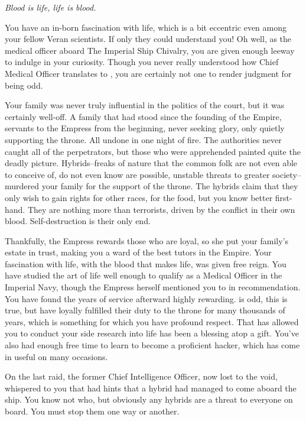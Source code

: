 \documentclass[char]{guildcamp4}
\begin{document}
\name{\cVthree{}}

\textit{Blood is life, life is blood.}

You have an in-born fascination with life, which is a bit eccentric even among your fellow Veran scientists. If only they could understand you! Oh well, as the medical officer aboard The Imperial Ship Chivalry, you are given enough leeway to indulge in your curiosity. Though you never really understood how Chief Medical Officer translates to \cVthree{\Baron}, you are certainly not one to render judgment for being odd.

Your family was never truly influential in the politics of the court, but it was certainly well-off. A family that had stood since the founding of the Empire, servants to the Empress from the beginning, never seeking glory, only quietly supporting the throne. All undone in one night of fire. The authorities never caught all of the perpetrators, but those who were apprehended painted quite the deadly picture. Hybrids--freaks of nature that the common folk are not even able to conceive of, do not even know are possible, unstable threats to greater society--murdered your family for the support of the throne. The hybrids claim that they only wish to gain rights for other races, for the food, but you know better first-hand. They are nothing more than terrorists, driven by the conflict in their own blood. Self-destruction is their only end. 

Thankfully, the Empress rewards those who are loyal, so she put your family's estate in trust, making you a ward of the best tutors in the Empire. Your fascination with life, with the blood that makes life, was given free reign. You have studied the art of life well enough to qualify as a Medical Officer in the Imperial Navy, though the Empress herself mentioned you to \cVone{} in recommendation. You have found the years of service afterward highly rewarding. \cVone{} is odd, this is true, but \cVone{\they} have loyally fulfilled their duty to the throne for many thousands of years, which is something for which you have profound respect. That \cVone{} has allowed you to conduct your side research into life has been a blessing atop a gift. You've also had enough free time to learn to become a proficient hacker, which has come in useful on many occasions.

On the last raid, the former Chief Intelligence Officer, now lost to the void, whispered to you that \cIntel{\they} had hints that a hybrid had managed to come aboard the ship. You know not who, but obviously any hybrids are a threat to everyone on board. You must stop them one way or another.
\end{document}
